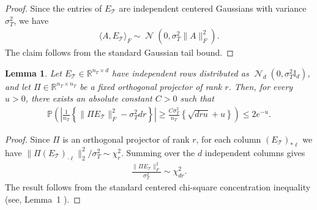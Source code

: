 \documentclass[10pt]{article}
\newtheorem{lemma}{Lemma}
\newcommand{\R}{\mathbb R}
\newcommand{\Id}{\mathbb I}
\DeclareMathOperator{\dnorm}{\mathcal N}
\newcommand{\calT}{\mathcal T}
\newcommand{\trg}{T}
\newcommand{\nT}{n_{\trg}}
\newcommand{\sigmaT}{\sigma_{\trg}}
\begin{document}
\begin{proof}
Since the entries of $E_\calT$ are independent centered Gaussians with variance
$\sigmaT^2$, we have
\begin{align}
    \langle A,E_\calT\rangle_F\sim \dnorm\left(0,\sigmaT^2\|A\|_F^2\right).
\end{align}
The claim follows from the standard Gaussian tail bound.
\end{proof}

\begin{lemma}
\label{lem:validation_projected_chisq_concentration}
Let $E_\calT\in\R^{\nT\times d}$ have independent rows distributed as
$\dnorm_d(0,\sigmaT^2\Id_d)$, and let $\Pi\in\R^{\nT\times \nT}$ be a fixed
orthogonal projector of rank $r$. Then, for every $u>0$, there exists an
absolute constant $C>0$ such that
\begin{align}
    \mathbb P\left(\left|\frac{1}{\nT}\left\{\|\Pi E_\calT\|_F^2-\sigmaT^2dr\right\}\right|
    \ge \frac{C\sigmaT^2}{\nT}\left\{\sqrt{dru}+u\right\}\right)\le 2e^{-u}.
\end{align}
\end{lemma}

\begin{proof}
Since $\Pi$ is an orthogonal projector of rank $r$, for each column
$(E_\calT)_{*\ell}$ we have
$\|\Pi(E_\calT)_{\cdot \ell}\|_2^2/\sigmaT^2\sim\chi_r^2$. Summing over the
$d$ independent columns gives
\begin{align}
    \frac{\|\Pi E_\calT\|_F^2}{\sigmaT^2}\sim \chi^2_{dr}.
\end{align}
The result follows from the standard centered chi-square concentration inequality (see, Lemma~1 \cite{laurent2000adaptive}).
\end{proof}
\end{document}
